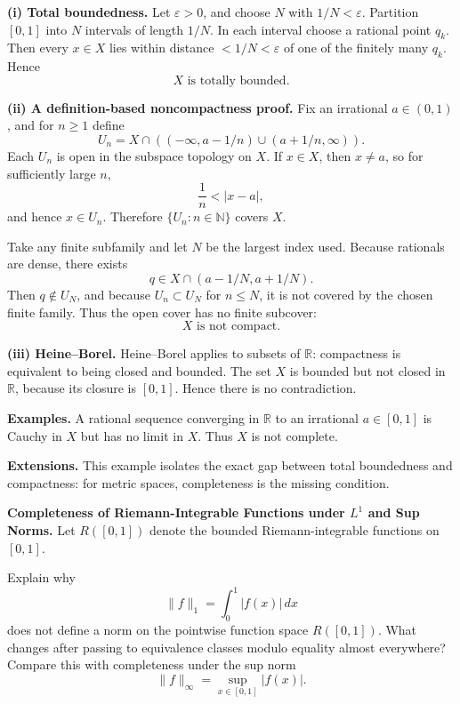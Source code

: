 \begin{solution}

\par\smallskip\noindent\textbf{(i) Total boundedness.}
Let \(\varepsilon>0\), and choose \(N\) with \(1/N<\varepsilon\). Partition
\([0,1]\) into \(N\) intervals of length \(1/N\). In each interval choose a
rational point \(q_k\). Then every \(x\in X\) lies within distance
\(<1/N<\varepsilon\) of one of the finitely many \(q_k\). Hence
\[
\boxed{X\text{ is totally bounded}.}
\]

\par\smallskip\noindent\textbf{(ii) A definition-based noncompactness proof.}
Fix an irrational \(a\in(0,1)\), and for \(n\ge1\) define
\[
U_n
=
X\cap\left(( -\infty,a-1/n)\cup(a+1/n,\infty)\right).
\]
Each \(U_n\) is open in the subspace topology on \(X\). If \(x\in X\), then
\(x\ne a\), so for sufficiently large \(n\),
\[
\frac1n<|x-a|,
\]
and hence \(x\in U_n\). Therefore \(\{U_n:n\in\mathbb N\}\) covers \(X\).

Take any finite subfamily and let \(N\) be the largest index used. Because
rationals are dense, there exists
\[
q\in X\cap(a-1/N,a+1/N).
\]
Then \(q\notin U_N\), and because \(U_n\subset U_N\) for \(n\le N\), it is
not covered by the chosen finite family. Thus the open cover has no finite
subcover:
\[
\boxed{X\text{ is not compact}.}
\]

\par\smallskip\noindent\textbf{(iii) Heine--Borel.}
Heine--Borel applies to subsets of \(\mathbb R\): compactness is equivalent to
being closed and bounded. The set \(X\) is bounded but not closed in
\(\mathbb R\), because its closure is \([0,1]\). Hence there is no
contradiction.

\medskip
\noindent\textbf{Examples.}
A rational sequence converging in \(\mathbb R\) to an irrational
\(a\in[0,1]\) is Cauchy in \(X\) but has no limit in \(X\). Thus \(X\) is
not complete.

\medskip
\noindent\textbf{Extensions.}
This example isolates the exact gap between total boundedness and compactness:
for metric spaces, completeness is the missing condition.
\end{solution}


\begin{problem}[CP-II-0441]
\label{prob:cp-ii-0441}
\textbf{Completeness of Riemann-Integrable Functions under \(L^1\) and Sup Norms.}
Let \(R([0,1])\) denote the bounded Riemann-integrable functions on \([0,1]\).

Explain why
\[
\|f\|_1=\int_0^1|f(x)|\,dx
\]
does not define a norm on the pointwise function space \(R([0,1])\).
What changes after passing to equivalence classes modulo equality almost
everywhere? Compare this with completeness under the sup norm
\[
\|f\|_\infty=\sup_{x\in[0,1]}|f(x)|.
\]
\end{problem}

